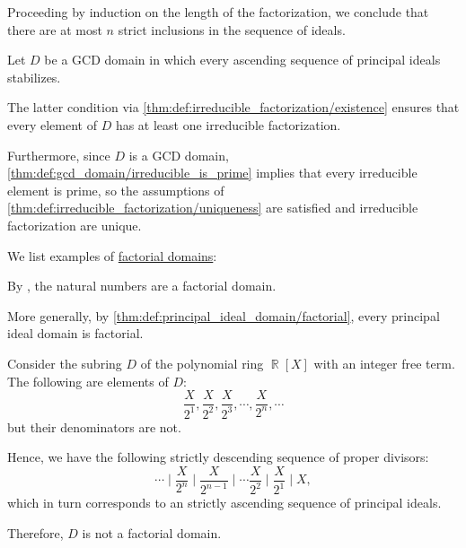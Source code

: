 \begin{defproof}
  Proceeding by induction on the length of the factorization, we conclude that there are at most \( n \) strict inclusions in the sequence of ideals.

   Let \( D \) be a GCD domain in which every ascending sequence of principal ideals stabilizes.

  The latter condition via \cref{thm:def:irreducible_factorization/existence} ensures that every element of \( D \) has at least one irreducible factorization.

  Furthermore, since \( D \) is a GCD domain, \cref{thm:def:gcd_domain/irreducible_is_prime} implies that every irreducible element is prime, so the assumptions of \cref{thm:def:irreducible_factorization/uniqueness} are satisfied and irreducible factorization are unique.
\end{defproof}

\begin{example}\label{ex:def:factorial_domain}
  We list examples of \hyperref[def:factorial_domain]{factorial domains}:
  \begin{thmenum}
     By , the natural numbers are a factorial domain.

     More generally, by \cref{thm:def:principal_ideal_domain/factorial}, every principal ideal domain is factorial.

     Consider the subring \( D \) of the polynomial ring \( \BbbR[X] \) with an integer free term. The following are elements of \( D \):
    \begin{equation*}
      \frac X {2^1}, \frac X {2^2}, \frac X {2^3}, \cdots, \frac X {2^n}, \cdots
    \end{equation*}
    but their denominators are not.

    Hence, we have the following strictly descending sequence of proper divisors:
    \begin{equation*}
      \cdots \mid \frac X {2^n} \mid \frac X {2^{n-1}} \mid \cdots \frac X {2^2} \mid \frac X {2^1} \mid X,
    \end{equation*}
    which in turn corresponds to an strictly ascending sequence of principal ideals.

    Therefore, \( D \) is not a factorial domain.
  \end{thmenum}
\end{example}

